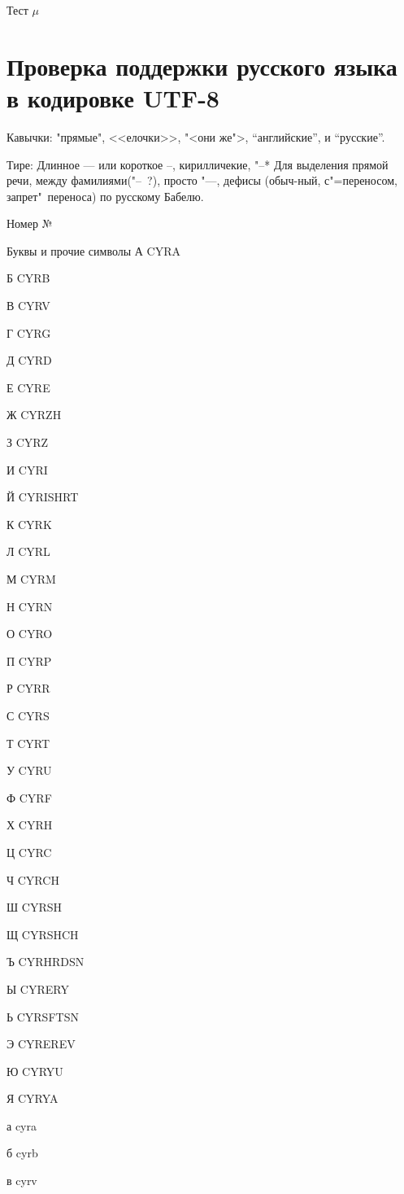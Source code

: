 \documentclass{amsart}
\begin{document}
 Тест $\mu$
\section{Проверка поддержки русского языка в кодировке UTF-8}
Кавычки: "прямые", <<елочки>>, "<они же">, ``английские'', и
"`русские"'.

Тире:
Длинное --- или короткое --, кирилличекие, "--* Для выделения прямой
речи, между фамилиями("--~?), просто "---, дефисы 
(обыч-ный, с"=переносом, запрет"~переноса) по русскому Бабелю.

Номер
№  \textnumero

Буквы и прочие символы 
А CYRA \CYRA

Б CYRB \CYRB

В CYRV \CYRV

Г CYRG \CYRG

Д CYRD \CYRD

Е CYRE \CYRE

Ж CYRZH \CYRZH

З CYRZ \CYRZ

И CYRI \CYRI

Й CYRISHRT \CYRISHRT

К CYRK \CYRK

Л CYRL \CYRL

М CYRM \CYRM

Н CYRN \CYRN

О CYRO \CYRO

П CYRP \CYRP

Р CYRR \CYRR

С CYRS \CYRS

Т CYRT \CYRT

У CYRU \CYRU

Ф CYRF \CYRF

Х CYRH \CYRH

Ц CYRC \CYRC

Ч CYRCH \CYRCH

Ш CYRSH \CYRSH

Щ CYRSHCH \CYRSHCH

Ъ CYRHRDSN \CYRHRDSN

Ы CYRERY \CYRERY

Ь CYRSFTSN \CYRSFTSN

Э CYREREV \CYREREV

Ю CYRYU \CYRYU

Я CYRYA \CYRYA

а cyra \cyra

б cyrb \cyrb

в cyrv \cyrv
\end{document}
